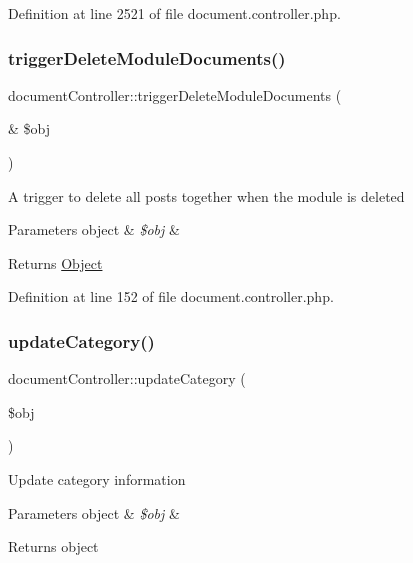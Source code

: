 Definition at line 2521 of file document.\+controller.\+php.

\mbox{\label{classdocumentController_a6b5c3aae5cb5a4fd51350a597963d73a}} 
\subsubsection{\texorpdfstring{trigger\+Delete\+Module\+Documents()}{triggerDeleteModuleDocuments()}}
{\footnotesize\ttfamily document\+Controller\+::trigger\+Delete\+Module\+Documents (\begin{DoxyParamCaption}\item[{\&}]{\$obj }\end{DoxyParamCaption})}

A trigger to delete all posts together when the module is deleted 
\begin{DoxyParams}[1]{Parameters}
object & {\em \$obj} & \\
\hline
\end{DoxyParams}
\begin{DoxyReturn}{Returns}
\hyperlink{classObject}{Object} 
\end{DoxyReturn}


Definition at line 152 of file document.\+controller.\+php.

\mbox{\label{classdocumentController_a7a4e53cda0765a416280e403b6193b0a}} 
\subsubsection{\texorpdfstring{update\+Category()}{updateCategory()}}
{\footnotesize\ttfamily document\+Controller\+::update\+Category (\begin{DoxyParamCaption}\item[{}]{\$obj }\end{DoxyParamCaption})}

Update category information 
\begin{DoxyParams}[1]{Parameters}
object & {\em \$obj} & \\
\hline
\end{DoxyParams}
\begin{DoxyReturn}{Returns}
object 
\end{DoxyReturn}


